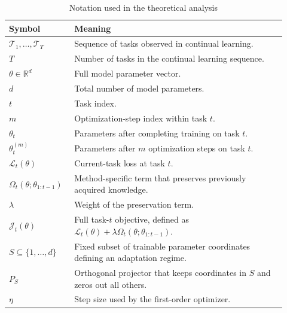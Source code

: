 \documentclass{article}
\begin{document}
\begin{table}[!h]
\centering
\small
\caption{Notation used in the theoretical analysis}
\begin{tabular}{p{0.20\linewidth} p{0.72\linewidth}}
\toprule
\textbf{Symbol} & \textbf{Meaning} \\
\midrule
$\mathcal{T}_1, \dots, \mathcal{T}_T$ & Sequence of tasks observed in continual learning. \\

$T$ & Number of tasks in the continual learning sequence. \\

$\theta \in \mathbb{R}^d$ & Full model parameter vector. \\

$d$ & Total number of model parameters. \\

$t$ & Task index. \\

$m$ & Optimization-step index within task $t$. \\

$\theta_t$ & Parameters after completing training on task $t$. \\

$\theta_t^{(m)}$ & Parameters after $m$ optimization steps on task $t$. \\

$\mathcal{L}_t(\theta)$ & Current-task loss at task $t$. \\

$\Omega_t(\theta;\theta_{1:t-1})$ & Method-specific term that preserves previously acquired knowledge. \\

$\lambda$ & Weight of the preservation term. \\

$\mathcal{J}_t(\theta)$ & Full task-$t$ objective, defined as $\mathcal{L}_t(\theta) + \lambda \Omega_t(\theta;\theta_{1:t-1})$. \\

$S \subseteq \{1,\dots,d\}$ & Fixed subset of trainable parameter coordinates defining an adaptation regime. \\

$P_S$ & Orthogonal projector that keeps coordinates in $S$ and zeros out all others. \\

$\eta$ & Step size used by the first-order optimizer. \\


\end{tabular}
\end{table}
\end{document}
